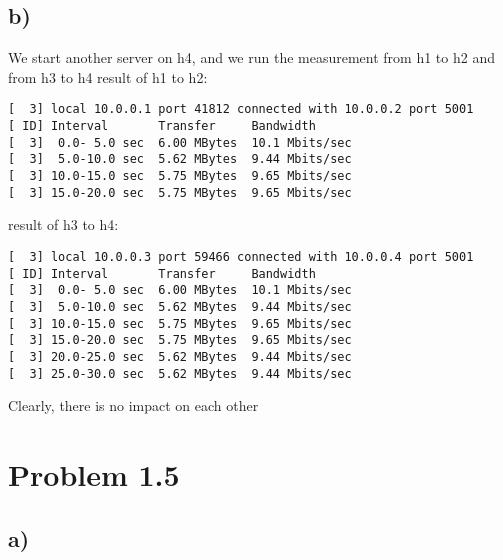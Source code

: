 \documentclass[11pt]{article}
\begin{document}
\subsection{b)}
\label{sec:orgc94b463}
We start another server on h4, and we run the measurement from h1 to h2 and from h3 to h4
result of h1 to h2:
\begin{verbatim}
[  3] local 10.0.0.1 port 41812 connected with 10.0.0.2 port 5001
[ ID] Interval       Transfer     Bandwidth
[  3]  0.0- 5.0 sec  6.00 MBytes  10.1 Mbits/sec
[  3]  5.0-10.0 sec  5.62 MBytes  9.44 Mbits/sec
[  3] 10.0-15.0 sec  5.75 MBytes  9.65 Mbits/sec
[  3] 15.0-20.0 sec  5.75 MBytes  9.65 Mbits/sec
\end{verbatim}
result of h3 to h4:
\begin{verbatim}
[  3] local 10.0.0.3 port 59466 connected with 10.0.0.4 port 5001
[ ID] Interval       Transfer     Bandwidth
[  3]  0.0- 5.0 sec  6.00 MBytes  10.1 Mbits/sec
[  3]  5.0-10.0 sec  5.62 MBytes  9.44 Mbits/sec
[  3] 10.0-15.0 sec  5.75 MBytes  9.65 Mbits/sec
[  3] 15.0-20.0 sec  5.75 MBytes  9.65 Mbits/sec
[  3] 20.0-25.0 sec  5.62 MBytes  9.44 Mbits/sec
[  3] 25.0-30.0 sec  5.62 MBytes  9.44 Mbits/sec
\end{verbatim}
Clearly, there is no impact on each other
\section{Problem 1.5}
\label{sec:org1fe9b27}
\subsection{a)}
\label{sec:org262535f}
\end{document}
